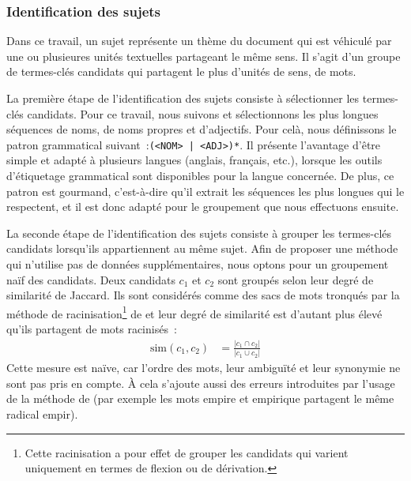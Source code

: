      \subsubsection{Identification des sujets}
      \label{subsubsec:main-automatic_keyphrase_annotation-unsupervised_automatic_keyphrase_extraction-topicrank-topic_identification}
        Dans ce travail, un sujet représente un thème du document qui est
        véhiculé par une ou plusieures unités textuelles partageant le même
        sens. Il s'agit d'un groupe de termes-clés candidats qui partagent le
        plus d'unités de sens, de mots.

        La première étape de l'identification des sujets consiste à sélectionner
        les termes-clés candidats.
        Pour ce travail, nous suivons  et
        sélectionnons les plus longues séquences de noms, de noms propres et
        d'adjectifs. Pour celà, nous définissons le patron grammatical
        suivant~:\texttt{(<NOM> | <ADJ>)*}. Il présente l'avantage d'être simple
        et adapté à plusieurs langues (anglais, français, etc.), lorsque les
        outils d'étiquetage grammatical sont disponibles pour la langue
        concernée. De plus, ce patron est gourmand, c'est-à-dire qu'il extrait
        les séquences les plus longues qui le respectent, et il est donc adapté
        pour le groupement que nous effectuons ensuite. 

        La seconde étape de l'identification des sujets consiste à grouper les
        termes-clés candidats lorsqu'ils appartiennent au même sujet. Afin de
        proposer une méthode qui n'utilise pas de données
        supplémentaires, nous optons pour un groupement naïf des
        candidats. Deux candidats $c_1$ et $c_2$ sont groupés selon leur degré
        de similarité de Jaccard. Ils sont considérés comme des sacs de
        mots tronqués par la méthode de racinisation\footnote{Cette
        racinisation a pour effet de grouper les candidats qui varient
        uniquement en termes de flexion ou de dérivation.} de
         et leur degré de similarité est
        d'autant plus élevé qu'ils partagent de mots racinisés~:
        \begin{align}
          \text{sim}(c_1, c_2) &= \frac{|c_1 \cap c_2|}{|c_1 \cup c_2|} \label{equa:jaccard}
        \end{align}
        Cette mesure est naïve, car l'ordre des mots, leur ambiguïté
        et leur synonymie ne sont pas pris en compte. À cela s'ajoute
        aussi des erreurs introduites par l'usage de la méthode de
         (par exemple les mots
        \og{}empire\fg{} et \og{}empirique\fg{} partagent le même radical
        \og{}empir\fg{}).

